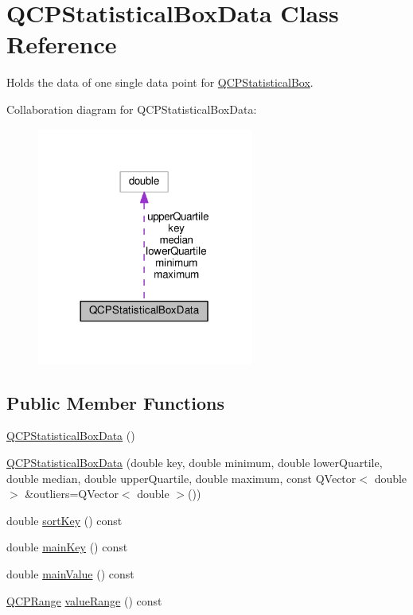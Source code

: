 \hypertarget{classQCPStatisticalBoxData}{}\section{Q\+C\+P\+Statistical\+Box\+Data Class Reference}
\label{classQCPStatisticalBoxData}


Holds the data of one single data point for \hyperlink{classQCPStatisticalBox}{Q\+C\+P\+Statistical\+Box}.  




Collaboration diagram for Q\+C\+P\+Statistical\+Box\+Data\+:
\nopagebreak
\begin{figure}[H]
\begin{center}
\leavevmode
\includegraphics[width=201pt]{classQCPStatisticalBoxData__coll__graph}
\end{center}
\end{figure}
\subsection*{Public Member Functions}
\begin{DoxyCompactItemize}
\item 
\hyperlink{classQCPStatisticalBoxData_ab96c4b93670a8dcac8a3d4080fd722ee}{Q\+C\+P\+Statistical\+Box\+Data} ()
\item 
\hyperlink{classQCPStatisticalBoxData_a66b0c6d39765d0feb49c286fba4e4ef5}{Q\+C\+P\+Statistical\+Box\+Data} (double key, double minimum, double lower\+Quartile, double median, double upper\+Quartile, double maximum, const Q\+Vector$<$ double $>$ \&outliers=Q\+Vector$<$ double $>$())
\item 
double \hyperlink{classQCPStatisticalBoxData_ad00ab8d43ec89a40ec7ee7ca154a2b0e}{sort\+Key} () const 
\item 
double \hyperlink{classQCPStatisticalBoxData_ae0f68c5e61909838e7e85618a6c72019}{main\+Key} () const 
\item 
double \hyperlink{classQCPStatisticalBoxData_a1c90d779c2ddf6d96da5384fd8121645}{main\+Value} () const 
\item 
\hyperlink{classQCPRange}{Q\+C\+P\+Range} \hyperlink{classQCPStatisticalBoxData_abe311ba7ba785215f791db23498f702f}{value\+Range} () const 
\end{DoxyCompactItemize}
